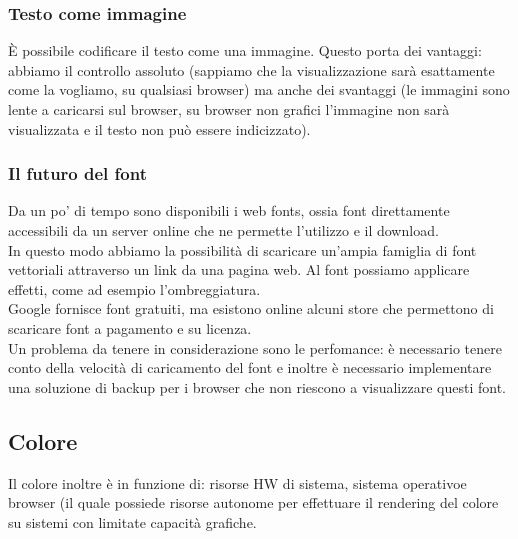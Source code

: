\documentclass{article}
\begin{document}
\subsubsection{Testo come immagine}
È possibile codificare il testo come una immagine. Questo porta dei vantaggi: abbiamo il controllo assoluto (sappiamo che la visualizzazione sarà esattamente come la vogliamo, su qualsiasi browser) ma anche dei svantaggi (le immagini sono lente a caricarsi sul browser, su browser non grafici l'immagine non sarà visualizzata e il testo non può essere indicizzato).
\subsubsection{Il futuro del font}
Da un po' di tempo sono disponibili i web fonts, ossia font direttamente accessibili da un server online che ne permette l'utilizzo e il download.\\
In questo modo abbiamo la possibilità di scaricare un'ampia famiglia di font vettoriali attraverso un link da una pagina web. Al font possiamo applicare effetti, come ad esempio l'ombreggiatura.\\
Google fornisce font gratuiti, ma esistono online alcuni store che permettono di scaricare font a pagamento e su licenza.\\
Un problema da tenere in considerazione sono le perfomance: è necessario tenere conto della velocità di caricamento del font e inoltre è necessario implementare una soluzione di backup per i browser che non riescono a visualizzare questi font.
\subsection{Colore}
Il colore inoltre è in funzione di: risorse HW di sistema, sistema operativoe browser (il quale possiede risorse autonome per effettuare il rendering del colore su sistemi con limitate capacità grafiche.
\end{document}
